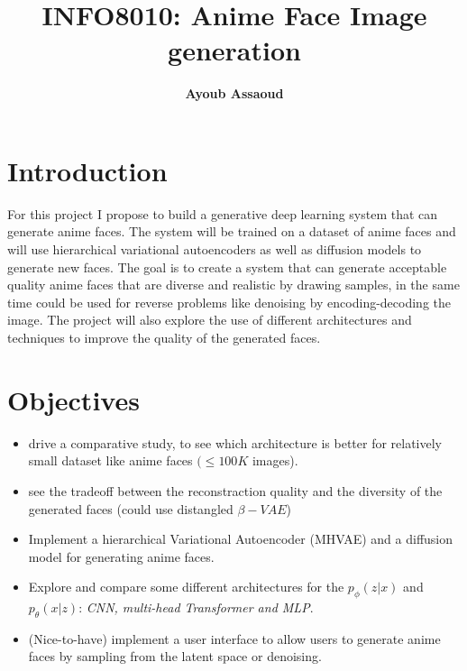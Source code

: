 \documentclass[twocolumn,superscriptaddress,aps]{revtex4-1}
\begin{document}
\title{\Large{INFO8010: Anime Face Image generation }}
\vspace{1cm}

\author{\small{\bf Ayoub Assaoud}}

\maketitle


\section{Introduction}

For this project I propose to build a generative deep learning system that can generate anime faces. The system will be trained on a dataset of anime faces and will use hierarchical  variational autoencoders as well as diffusion models to generate new faces. 
The goal is to create a system that can generate  acceptable quality anime faces that are diverse and realistic by drawing samples, in the same time could be used for reverse problems like denoising by encoding-decoding the image. The project will also explore the use of different  architectures and techniques to improve the quality of the generated faces. 

\section{Objectives}
\begin{itemize}
    \item drive a comparative study, to see which architecture is better for relatively small dataset like anime faces $(\le 100K $ images).
    \item see the tradeoff between the reconstraction quality and the diversity of the generated faces (could use distangled $\beta-VAE$)
    \item Implement a hierarchical Variational Autoencoder (MHVAE) and a diffusion model  for generating anime faces.
    \item Explore and compare some different architectures for the $p_\phi (z|x)$ and $p_\theta (x|z)$: \textit{CNN, multi-head Transformer and MLP}.
    \item (Nice-to-have) implement a user interface to allow users to generate anime faces by sampling from the latent space or denoising.
\end{itemize} 
\end{document}
